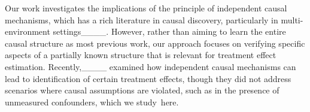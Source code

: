Our work investigates the implications of the principle of independent causal mechanisms, which has a rich literature in causal discovery, particularly in multi-environment settings____. However, rather than aiming to learn the entire causal structure as most previous work, our approach focuses on verifying specific aspects of a partially known structure that is relevant for treatment effect estimation. Recently,____ examined how independent causal mechanisms can lead to identification of certain treatment effects, though they did not address scenarios where causal assumptions are violated, such as in the presence of unmeasured confounders, which we study~here.